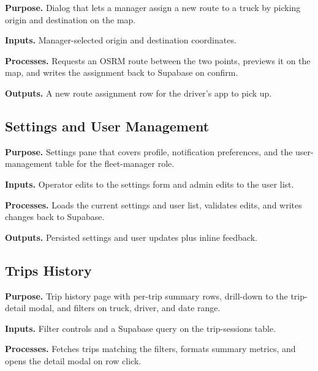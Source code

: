 \noindent\textbf{Purpose.} Dialog that lets a manager assign a new route to a truck by picking origin and destination on the map.

\noindent\textbf{Inputs.} Manager-selected origin and destination coordinates.

\noindent\textbf{Processes.} Requests an OSRM route between the two points, previews it on the map, and writes the assignment back to Supabase on confirm.

\noindent\textbf{Outputs.} A new route assignment row for the driver's app to pick up.



\subsection{Settings and User Management}
\label{sec:code_frontend_settings}

\noindent\textbf{Purpose.} Settings pane that covers profile, notification preferences, and the user-management table for the fleet-manager role.

\noindent\textbf{Inputs.} Operator edits to the settings form and admin edits to the user list.

\noindent\textbf{Processes.} Loads the current settings and user list, validates edits, and writes changes back to Supabase.

\noindent\textbf{Outputs.} Persisted settings and user updates plus inline feedback.



\subsection{Trips History}
\label{sec:code_frontend_trips}

\noindent\textbf{Purpose.} Trip history page with per-trip summary rows, drill-down to the trip-detail modal, and filters on truck, driver, and date range.

\noindent\textbf{Inputs.} Filter controls and a Supabase query on the trip-sessions table.

\noindent\textbf{Processes.} Fetches trips matching the filters, formats summary metrics, and opens the detail modal on row click.

